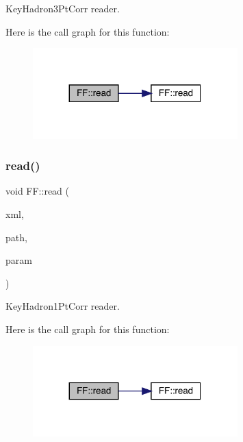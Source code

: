 Key\+Hadron3\+Pt\+Corr reader. 

Here is the call graph for this function\+:
\nopagebreak
\begin{figure}[H]
\begin{center}
\leavevmode
\includegraphics[width=224pt]{d5/da6/namespaceFF_a457d1bd921b678eadc34fb2dbfcbdb32_cgraph}
\end{center}
\end{figure}
\mbox{\label{namespaceFF_acb4db5dbe27937736b4f2cbed9694c56}} 
\subsubsection{\texorpdfstring{read()}{read()}\hspace{0.1cm}{\footnotesize\ttfamily [6/15]}}
{\footnotesize\ttfamily void F\+F\+::read (\begin{DoxyParamCaption}\item[{X\+M\+L\+Reader \&}]{xml,  }\item[{const std\+::string \&}]{path,  }\item[{\mbox{\hyperlink{structFF_1_1KeyHadron1PtCorr__t}{Key\+Hadron1\+Pt\+Corr\+\_\+t}} \&}]{param }\end{DoxyParamCaption})}



Key\+Hadron1\+Pt\+Corr reader. 

Here is the call graph for this function\+:
\nopagebreak
\begin{figure}[H]
\begin{center}
\leavevmode
\includegraphics[width=224pt]{d5/da6/namespaceFF_acb4db5dbe27937736b4f2cbed9694c56_cgraph}
\end{center}
\end{figure}
\mbox{\label{namespaceFF_ac879699f10e046e5a2059a2efcf1408b}} 
